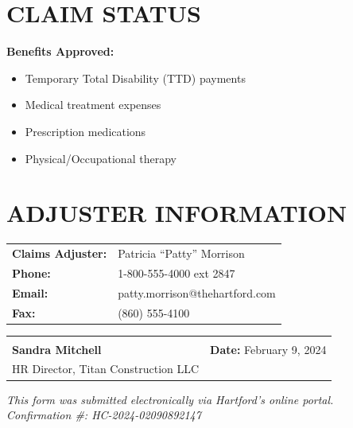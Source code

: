 \documentclass[11pt]{article}
\begin{document}
\section*{CLAIM STATUS}

\vspace{0.5em}
\begin{center}
\end{center}

\vspace{1em}

\textbf{Benefits Approved:}
\begin{itemize}[nosep]
\item Temporary Total Disability (TTD) payments
\item Medical treatment expenses
\item Prescription medications
\item Physical/Occupational therapy
\end{itemize}

\section*{ADJUSTER INFORMATION}

\begin{tabular}{@{}p{4cm}p{10cm}@{}}
\textbf{Claims Adjuster:} & Patricia ``Patty'' Morrison \\
\textbf{Phone:} & 1-800-555-4000 ext 2847 \\
\textbf{Email:} & patty.morrison@thehartford.com \\
\textbf{Fax:} & (860) 555-4100 \\
\end{tabular}

\vspace{2em}

\begin{tabular}{@{}p{7cm}p{7cm}@{}}
\hrulefill & \hrulefill \\
\textbf{Sandra Mitchell} & \textbf{Date:} February 9, 2024 \\
HR Director, Titan Construction LLC & \\
\end{tabular}

\vspace{2em}

\begin{center}
\small\textit{This form was submitted electronically via Hartford's online portal.\\
Confirmation \#: HC-2024-02090892147}
\end{center}
\end{document}
